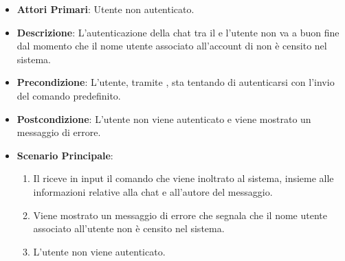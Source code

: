 	\begin{itemize}
		\item \textbf{Attori Primari}: Utente non autenticato.
		\item \textbf{Descrizione}: L'autenticazione della chat tra il  e l'utente non va a buon fine dal momento che il nome utente associato all'account di  non è censito nel sistema.
		\item \textbf{Precondizione}: L'utente, tramite , sta tentando di autenticarsi con l'invio del comando predefinito.
		\item \textbf{Postcondizione}: L'utente non viene autenticato e viene mostrato un messaggio di errore.
		\item \textbf{Scenario Principale}:
		\begin{enumerate}
			\item Il   riceve in input il comando che viene inoltrato al sistema, insieme alle informazioni relative alla chat e all'autore del messaggio.
			\item Viene mostrato un messaggio di errore che segnala che il nome utente associato all'utente  non è censito nel sistema.
			\item L'utente non viene autenticato.
		\end{enumerate}
	\end{itemize}